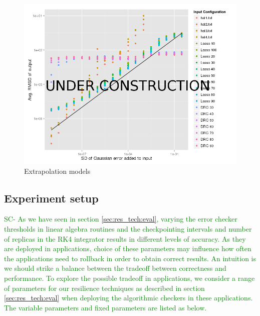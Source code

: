 \documentclass{sig-alternate}
\newcommand{\sui}[1]{%
  \textcolor{green}{SC-#1}
}
\begin{document}
\begin{figure}[ht!]
\centering
\includegraphics[width=1.00\columnwidth]{figs/InputVarianceOutputRMSD.png}
\caption{Extrapolation models}
\label{fig:inputvarianceoutputrmsd}
\end{figure}

\subsection{Experiment setup}
\label{sec:eval:confs}

\sui{
As we have seen in section \ref{sec:res_tech:eval}, varying the error checker thresholds in linear algebra routines and the checkpointing intervals and number of 
replicas in the RK4 integrator results in different levels of accuracy. As they are deployed in applications, choice of these parameters may influence how often
the applications need to rollback in order to obtain correct results. An intuition is we should strike a balance between the tradeoff between correctness
and performance. To explore the possible tradeoff in applications, we consider a range of parameters for our resilience techniques as described in section \ref{sec:res_tech:eval} when deploying the algorithmic checkers in these applications. The variable parameters and fixed parameters are listed as below.
}
\end{document}
